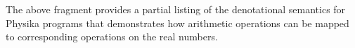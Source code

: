 \documentclass[book.tex]{subfiles}
\begin{document}
The above fragment provides a partial listing of the denotational semantics for Physika programs that demonstrates how arithmetic operations can be mapped to corresponding operations on the real numbers.






%
\end{document}
